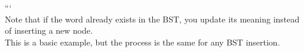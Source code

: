\documentclass[preview]{standalone}
\begin{document}
```\\Note that if the word already exists in the BST, you update its meaning instead of inserting a new node.\\This is a basic example, but the process is the same for any BST insertion.\\
\end{document}
